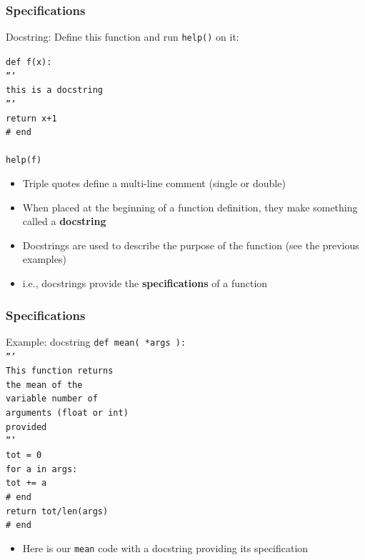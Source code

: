 \documentclass{beamer}
\newcommand{\code}[1]{\texttt{#1}}
\newcommand{\tab}{\hspace*{22pt}}
\begin{document}
\begin{frame}%
	\frametitle{Specifications}
	
	\begin{block}{Docstring:}
		Define this function and run \code{help()} on it:
		
		\vspace{15pt}
			\code{def f(x): \\
			\tab ''' \\
			\tab this is a docstring \\
			\tab ''' \\
			\tab return x+1 \\
			\# end \\
			\tab \\
			help(f)
			}
		\endminipage\hfill
			\begin{itemize}
				\item Triple quotes define a multi-line comment (single or double)
				\item When placed at the beginning of a function definition, they make something called a \textbf{docstring}
				\item Docstrings are used to describe the purpose of the function (see the previous examples)
				\item i.e., docstrings provide the \textbf{specifications} of a function
			\end{itemize}
		\endminipage\hfill
	\end{block}
	
\end{frame}

\begin{frame}%
	\frametitle{Specifications}
	
	\begin{block}{Example: docstring}
			\code{def mean( *args ):\\
					\tab ''' \\
					\tab This function returns \\
					\tab the mean of the \\
					\tab variable number of \\
					\tab arguments (float or int) \\
					\tab provided \\
					\tab ''' \\
					\tab tot = 0 \\
					\tab for a in args: \\
					\tab \tab tot += a \\
					\tab \# end \\
					\tab return tot/len(args) \\
					\# end
			}
		\endminipage\hfill
			\begin{itemize}
			\item Here is our \code{mean} code with a docstring providing its specification
			\end{itemize}
		\endminipage\hfill
	\end{block}
	
\end{frame}
\end{document}

